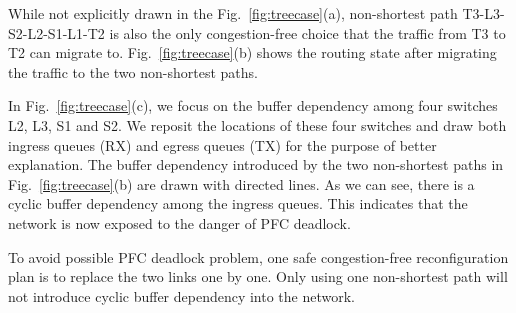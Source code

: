 While not explicitly drawn in the Fig.~\ref{fig:treecase}(a), non-shortest path T3-L3-S2-L2-S1-L1-T2 is also the only congestion-free choice that the traffic from T3 to T2 can migrate to. Fig.~\ref{fig:treecase}(b) shows the routing state after migrating the traffic to the two non-shortest paths. 

In Fig.~\ref{fig:treecase}(c), we focus on the buffer dependency among four switches L2, L3, S1 and S2. We reposit the locations of these four switches and draw both ingress queues (RX) and egress queues (TX) for the purpose of better explanation. The buffer dependency introduced by the two non-shortest paths in Fig.~\ref{fig:treecase}(b) are drawn with directed lines. As we can see, there is a cyclic buffer dependency among the ingress queues. This indicates that the network is now exposed to the danger of PFC deadlock.

To avoid possible PFC deadlock problem, one safe congestion-free reconfiguration plan is to replace the two links one by one. Only using one non-shortest path will not introduce cyclic buffer dependency into the network.

